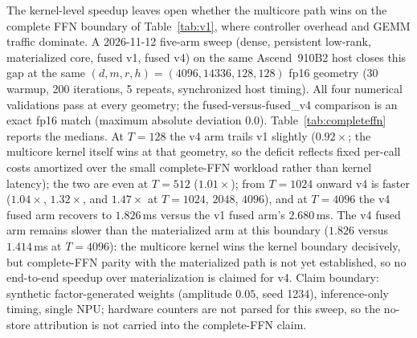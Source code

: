 \begin{table}[t]
\centering\small
\caption{Validated v1-versus-v4 kernel-latency sweep from the hardened
2026-11-08 re-run, emitted by the audit script from the archived
benchmark record. The timing boundary is the
\texttt{ephemeral\_core\_apply} operator alone, not the complete FFN of
Table~\ref{tab:v1}. Medians of synchronized host timing over the recorded
sample; ratio is single-core divided by multicore. The 1000-call
stability gate passes on this record (final maximum absolute error
$0.00390625$, zero transient or persistent failures); this is a
kernel-latency result, not a memory-traffic or trained-model claim.}
\label{tab:multicore}

\end{table}

The kernel-level speedup leaves open whether the multicore path wins on
the complete FFN boundary of Table~\ref{tab:v1}, where controller
overhead and GEMM traffic dominate. A 2026-11-12 five-arm sweep
(dense, persistent low-rank, materialized core, fused v1, fused v4)
on the same Ascend~910B2 host closes this gap at the same
$(d,m,r,h)=(4096,14336,128,128)$ fp16 geometry
(30 warmup, 200 iterations, 5 repeats, synchronized host timing).
All four numerical validations pass at every geometry; the
fused-versus-fused\_v4 comparison is an exact fp16 match
(maximum absolute deviation $0.0$). Table~\ref{tab:completeffn} reports
the medians. At $T{=}128$ the v4 arm trails v1 slightly ($0.92\times$;
the multicore kernel itself wins at that geometry, so the deficit
reflects fixed per-call costs amortized over the small complete-FFN
workload rather than kernel latency); the two are even at $T{=}512$
($1.01\times$); from $T{=}1024$
onward v4 is faster
($1.04\times$, $1.32\times$, and $1.47\times$ at $T{=}1024$, $2048$,
$4096$), and at $T{=}4096$ the v4 fused arm recovers to
$1.826$\,ms versus the v1 fused arm's $2.680$\,ms. The v4 fused arm
remains slower than the materialized arm at this boundary
($1.826$ versus $1.414$\,ms at $T{=}4096$): the multicore kernel wins
the kernel boundary decisively, but complete-FFN parity with the
materialized path is not yet established, so no end-to-end speedup over
materialization is claimed for v4. Claim boundary: synthetic
factor-generated weights (amplitude $0.05$, seed 1234), inference-only
timing, single NPU; hardware counters are not parsed for this sweep, so
the no-store attribution is not carried into the complete-FFN claim.

